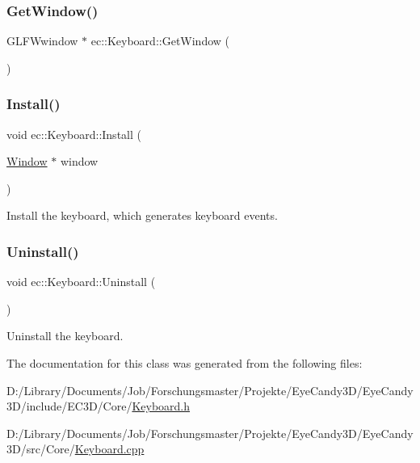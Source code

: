 \subsubsection{\texorpdfstring{Get\+Window()}{GetWindow()}}
{\footnotesize\ttfamily G\+L\+F\+Wwindow $\ast$ ec\+::\+Keyboard\+::\+Get\+Window (\begin{DoxyParamCaption}{ }\end{DoxyParamCaption})}

\mbox{\label{classec_1_1_keyboard_ab6e5cd1eeb0346198895203918a6c6d5}} 
\subsubsection{\texorpdfstring{Install()}{Install()}}
{\footnotesize\ttfamily void ec\+::\+Keyboard\+::\+Install (\begin{DoxyParamCaption}\item[{\mbox{\hyperlink{classec_1_1_window}{Window}} $\ast$}]{window }\end{DoxyParamCaption})}

Install the keyboard, which generates keyboard events. \mbox{\label{classec_1_1_keyboard_a06d27f5a8cdc6800b0792beb78699187}} 
\subsubsection{\texorpdfstring{Uninstall()}{Uninstall()}}
{\footnotesize\ttfamily void ec\+::\+Keyboard\+::\+Uninstall (\begin{DoxyParamCaption}{ }\end{DoxyParamCaption})}

Uninstall the keyboard. 

The documentation for this class was generated from the following files\+:\begin{DoxyCompactItemize}
\item 
D\+:/\+Library/\+Documents/\+Job/\+Forschungsmaster/\+Projekte/\+Eye\+Candy3\+D/\+Eye\+Candy3\+D/include/\+E\+C3\+D/\+Core/\mbox{\hyperlink{_keyboard_8h}{Keyboard.\+h}}\item 
D\+:/\+Library/\+Documents/\+Job/\+Forschungsmaster/\+Projekte/\+Eye\+Candy3\+D/\+Eye\+Candy3\+D/src/\+Core/\mbox{\hyperlink{_keyboard_8cpp}{Keyboard.\+cpp}}\end{DoxyCompactItemize}
